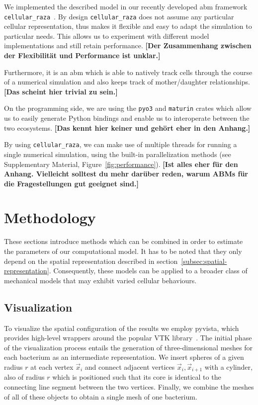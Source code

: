 \documentclass{article}
\begin{document}
We implemented the described model in our recently developed \ac{abm} framework
\texttt{cellular\_raza}~\cite{Pleyer2025}.
By design \texttt{cellular\_raza} does not assume any particular cellular representation, thus makes
it flexible and easy to adapt the simulation to particular needs. This allows us to experiment with
different model implementations and still retain performance.
\textbf{[Der Zusammenhang zwischen der Flexibilität und Performance ist unklar.]}

Furthermore, it is an \ac{abm} which is able to natively track cells through the course of a
numerical simulation and also keeps track of mother/daughter relationships.
\textbf{[Das scheint hier trivial zu sein.]}

On the programming side, we are using the \texttt{pyo3} and \texttt{maturin} crates which allow us
to easily generate Python bindings and enable us to interoperate between the two ecosystems.
\textbf{[Das kennt hier keiner und gehört eher in den Anhang.]}

By using \texttt{cellular\_raza}, we can make use of multiple threads for running a single numerical
simulation, using the built-in parallelization methods (see Supplementary Material,
Figure~\ref{fig:performance}).
\textbf{[Ist alles eher für den Anhang. Vielleicht solltest du mehr darüber reden, warum ABMs für die Fragestellungen gut geeignet sind.]}

\section{Methodology}
These sections introduce methods which can be combined in order to estimate the parameters of our
computational model.
It has to be noted that they only depend on the spatial representation described in
section~\ref{subsec:spatial-representation}.
Consequently, these models can be applied to a broader class of mechanical models that may exhibit
varied cellular behaviours.

\subsection{Visualization}
\label{subsection:visualization}
To visualize the spatial configuration of the results we employ pyvista, which provides high-level
wrappers around the popular VTK library~\cite{vtkBook,Sullivan2019}.
The initial phase of the visualization process entails the generation of three-dimensional meshes
for each bacterium as an intermediate representation.
We insert spheres of a given radius $r$ at each vertex $\vec{x}_i$ and connect adjacent vertices
$\vec{x}_i,\vec{x}_{i+1}$ with a cylinder, also of radius $r$ which is positioned such that its core
is identical to the connecting line segment between the two vertices.
Finally, we combine the meshes of all of these objects to obtain a single mesh of one bacterium.
\end{document}
